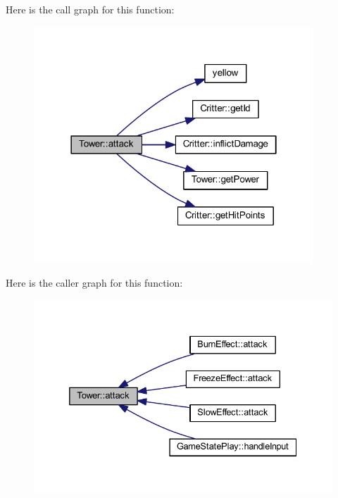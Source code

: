 Here is the call graph for this function\+:\nopagebreak
\begin{figure}[H]
\begin{center}
\leavevmode
\includegraphics[width=298pt]{class_tower_a9f067c2b9e5e6987f341704b8b098606_cgraph}
\end{center}
\end{figure}




Here is the caller graph for this function\+:\nopagebreak
\begin{figure}[H]
\begin{center}
\leavevmode
\includegraphics[width=332pt]{class_tower_a9f067c2b9e5e6987f341704b8b098606_icgraph}
\end{center}
\end{figure}


